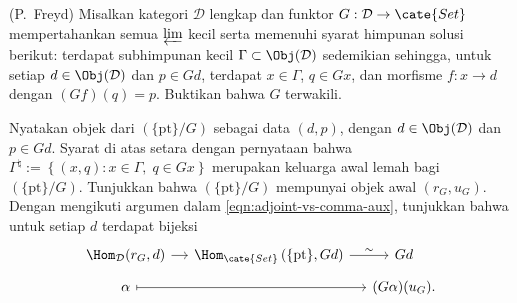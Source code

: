 \begin{Exercises}
	\item (P.\ Freyd) Misalkan kategori $\mathcal{D}$ lengkap dan funktor
	$G:\mathcal{D}\to\cate{Set}$ mempertahankan semua $\varprojlim$ kecil
	serta memenuhi syarat himpunan solusi berikut: terdapat subhimpunan kecil
	$\Gamma\subset\Obj(\mathcal{D})$ sedemikian sehingga, untuk setiap
	$d\in\Obj(\mathcal{D})$ dan $p\in Gd$, terdapat $x\in\Gamma$, $q\in Gx$,
	dan morfisme $f:x\to d$ dengan $(Gf)(q)=p$. Buktikan bahwa $G$ terwakili.

	\begin{hint}
		Nyatakan objek dari $\left(\{\mathrm{pt}\}/G\right)$ sebagai data
		$(d,p)$, dengan $d\in\Obj(\mathcal{D})$ dan $p\in Gd$. Syarat di atas
		setara dengan pernyataan bahwa
		$\Gamma^\natural:=\left\{(x,q):x\in\Gamma,\;q\in Gx\right\}$ merupakan
		keluarga awal lemah bagi $\left(\{\mathrm{pt}\}/G\right)$. Tunjukkan
		bahwa $\left(\{\mathrm{pt}\}/G\right)$ mempunyai objek awal
		$(r_G,u_G)$. Dengan mengikuti argumen dalam
		\eqref{eqn:adjoint-vs-comma-aux}, tunjukkan bahwa untuk setiap $d$
		terdapat bijeksi
		\[\begin{tikzcd}[row sep=tiny, column sep=small]
			\Hom_{\mathcal{D}}(r_G, d) \arrow[r] & \Hom_{\cate{Set}}\left( \{\mathrm{pt}\}, Gd \right) \arrow[r, "\sim"] & Gd \\
			\alpha \arrow[mapsto, rr] & & (G\alpha)(u_G) .
		\end{tikzcd}\]
	\end{hint}
\end{Exercises}
